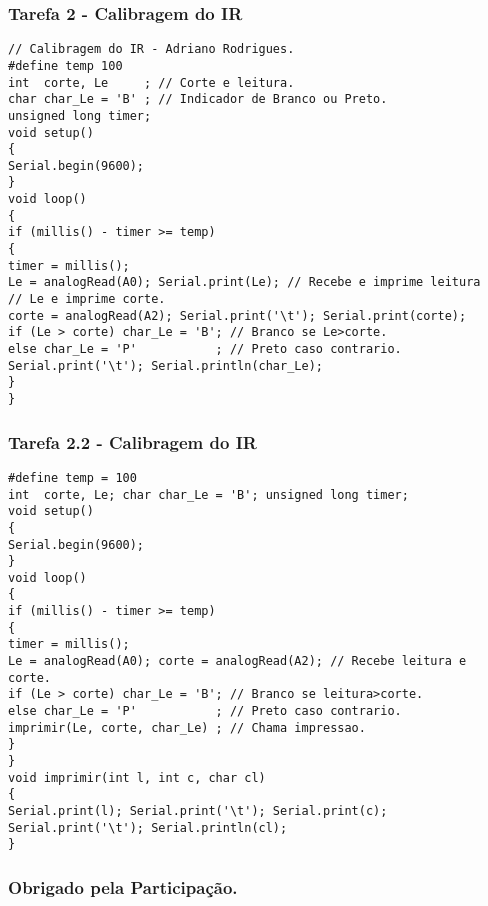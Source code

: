 \documentclass{beamer}
\begin{document}
\begin{frame}[fragile]
	\frametitle{Tarefa 2 - Calibragem do IR}
	\begin{lstlisting}[style=Arduino,basicstyle=\scriptsize \ttfamily]
// Calibragem do IR - Adriano Rodrigues.
#define temp 100
int  corte, Le     ; // Corte e leitura.
char char_Le = 'B' ; // Indicador de Branco ou Preto.
unsigned long timer;
void setup()
{
Serial.begin(9600);
}
void loop()
{
if (millis() - timer >= temp)
{
timer = millis();
Le = analogRead(A0); Serial.print(Le); // Recebe e imprime leitura
// Le e imprime corte.
corte = analogRead(A2); Serial.print('\t'); Serial.print(corte);
if (Le > corte) char_Le = 'B'; // Branco se Le>corte.
else char_Le = 'P'           ; // Preto caso contrario.
Serial.print('\t'); Serial.println(char_Le);
}
}
\end{lstlisting}
\end{frame}

\begin{frame}[fragile]
	\frametitle{Tarefa 2.2 - Calibragem do IR}
	\begin{lstlisting}[style=Arduino,basicstyle=\scriptsize \ttfamily]
#define temp = 100
int  corte, Le; char char_Le = 'B'; unsigned long timer;
void setup()
{
Serial.begin(9600);
}
void loop()
{
if (millis() - timer >= temp)
{
timer = millis();
Le = analogRead(A0); corte = analogRead(A2); // Recebe leitura e corte.
if (Le > corte) char_Le = 'B'; // Branco se leitura>corte.
else char_Le = 'P'           ; // Preto caso contrario.
imprimir(Le, corte, char_Le) ; // Chama impressao.
}
}
void imprimir(int l, int c, char cl)
{
Serial.print(l); Serial.print('\t'); Serial.print(c);
Serial.print('\t'); Serial.println(cl);
}
\end{lstlisting}
\end{frame}

\begin{frame}
	\frametitle{Obrigado pela Participação.}
	\titlepage
\end{frame}
	
\end{document}

